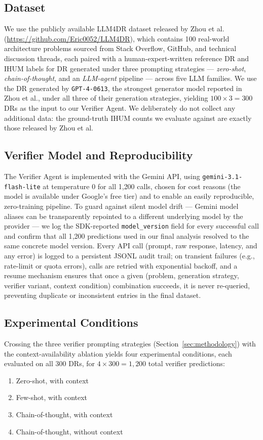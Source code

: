 \documentclass[runningheads]{llncs}
\begin{document}
\subsection{Dataset}
We use the publicly available LLM4DR dataset released by Zhou et al.\ \cite{zhou2025llm} (\url{https://github.com/Eric0052/LLM4DR}), which contains 100 real-world architecture problems sourced from Stack Overflow, GitHub, and technical discussion threads, each paired with a human-expert-written reference DR and IHUM labels for DR generated under three prompting strategies --- \emph{zero-shot}, \emph{chain-of-thought}, and an \emph{LLM-agent} pipeline --- across five LLM families. We use the DR generated by \texttt{GPT-4-0613}, the strongest generator model reported in Zhou et al., under all three of their generation strategies, yielding $100 \times 3 = 300$ DRs as the input to our Verifier Agent. We deliberately do not collect any additional data: the ground-truth IHUM counts we evaluate against are exactly those released by Zhou et al.

\subsection{Verifier Model and Reproducibility}
The Verifier Agent is implemented with the Gemini API, using \texttt{gemini-3.1-flash-lite} at temperature $0$ for all 1{,}200 calls, chosen for cost reasons (the model is available under Google's free tier) and to enable an easily reproducible, zero-training pipeline. To guard against silent model drift --- Gemini model aliases can be transparently repointed to a different underlying model by the provider --- we log the SDK-reported \texttt{model\_version} field for every successful call and confirm that all 1{,}200 predictions used in our final analysis resolved to the same concrete model version. Every API call (prompt, raw response, latency, and any error) is logged to a persistent JSONL audit trail; on transient failures (e.g., rate-limit or quota errors), calls are retried with exponential backoff, and a resume mechanism ensures that once a given (problem, generation strategy, verifier variant, context condition) combination succeeds, it is never re-queried, preventing duplicate or inconsistent entries in the final dataset.

\subsection{Experimental Conditions}
Crossing the three verifier prompting strategies (Section~\ref{sec:methodology}) with the context-availability ablation yields four experimental conditions, each evaluated on all 300 DRs, for $4 \times 300 = 1{,}200$ total verifier predictions:
\begin{enumerate}
\item Zero-shot, with context
\item Few-shot, with context
\item Chain-of-thought, with context
\item Chain-of-thought, without context
\end{enumerate}
\end{document}
